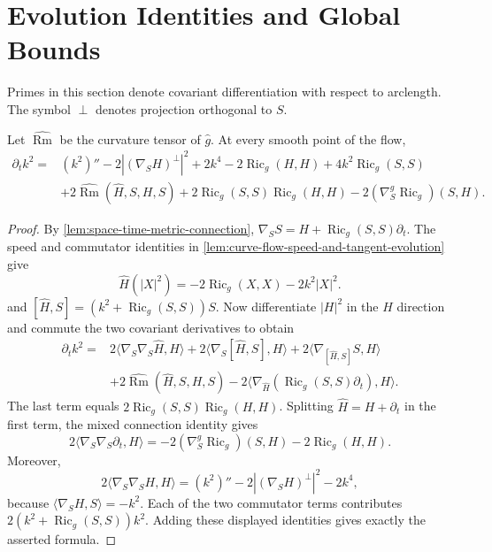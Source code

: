 \section{Evolution Identities and Global Bounds}

Primes in this section denote covariant differentiation with respect to
arclength.  The symbol $\perp$ denotes projection orthogonal to $S$.

\begin{theorem}
\label{thm:curve-flow-curvature-evolution}
\notready
Let $\widehat{\operatorname{Rm}}$ be the curvature
tensor of $\widehat g$.  At every smooth point of the flow,
\begin{align*}
 \partial_t k^2={}&(k^2)''-2| (\nabla_SH)^\perp|^2+2k^4
 -2\operatorname{Ric}_g(H,H)+4k^2\operatorname{Ric}_g(S,S)\\
 &+2\widehat{\operatorname{Rm}}(\widehat H,S,H,S)
 +2\operatorname{Ric}_g(S,S)\operatorname{Ric}_g(H,H)
 -2(\nabla^g_S\operatorname{Ric}_g)(S,H).
\end{align*}
\end{theorem}
\begin{proof}
By \ref{lem:space-time-metric-connection},
$\nabla_SS=H+\operatorname{Ric}_g(S,S)\partial_t$.  The speed and commutator
identities in \ref{lem:curve-flow-speed-and-tangent-evolution} give
\[
 \widehat H(|X|^2)=-2\operatorname{Ric}_g(X,X)-2k^2|X|^2.
\]
and $[\widehat H,S]=(k^2+\operatorname{Ric}_g(S,S))S$.  Now differentiate
$|H|^2$ in the $\widehat H$ direction and commute the two covariant
derivatives to obtain
\begin{align*}
 \partial_tk^2={}&2\langle\nabla_S\nabla_S\widehat H,H\rangle
 +2\langle\nabla_S[\widehat H,S],H\rangle
 +2\langle\nabla_{[\widehat H,S]}S,H\rangle\\
 &+2\widehat{\operatorname{Rm}}(\widehat H,S,H,S)
 -2\langle\nabla_{\widehat H}
  (\operatorname{Ric}_g(S,S)\partial_t),H\rangle .
\end{align*}
The last term equals
$2\operatorname{Ric}_g(S,S)\operatorname{Ric}_g(H,H)$.  Splitting
$\widehat H=H+\partial_t$ in the first term, the mixed connection identity
gives
\[
 2\langle\nabla_S\nabla_S\partial_t,H\rangle
 =-2(\nabla^g_S\operatorname{Ric}_g)(S,H)
  -2\operatorname{Ric}_g(H,H).
\]
Moreover,
\[
 2\langle\nabla_S\nabla_SH,H\rangle
 =(k^2)''-2|(\nabla_SH)^\perp|^2-2k^4,
\]
because $\langle\nabla_SH,S\rangle=-k^2$.  Each of the two commutator
terms contributes
$2(k^2+\operatorname{Ric}_g(S,S))k^2$.  Adding these displayed
identities gives exactly the asserted formula.
\end{proof}

